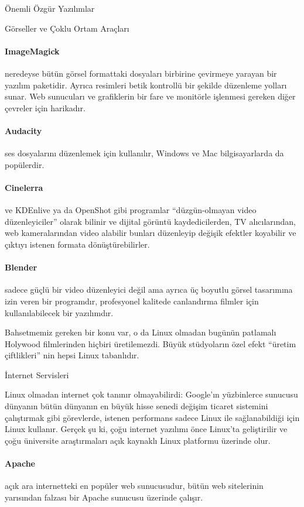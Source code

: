 \begin{section}{Önemli Özgür Yazılımlar}
\begin{subsection}{Görseller ve Çoklu Ortam Araçları}
\paragraph{ImageMagick}{neredeyse bütün görsel formattaki dosyaları birbirine çevirmeye yarayan bir yazılım paketidir. Ayrıca resimleri betik kontrollü bir şekilde düzenleme yolları sunar. Web sunucuları ve grafiklerin bir fare ve monitörle işlenmesi gereken diğer çevreler için harikadır.}
\paragraph{Audacity}{ses dosyalarını düzenlemek için kullanılır, Windows ve Mac bilgisayarlarda da popülerdir.}
\paragraph{Cinelerra}{ve KDEnlive ya da OpenShot gibi programlar “düzgün-olmayan video düzenleyiciler” olarak bilinir ve dijital görüntü kaydedicilerden, TV alıcılarından, web kameralarından video alabilir bunları düzenleyip değişik efektler koyabilir ve çıktıyı istenen formata dönüştürebilirler.}
\paragraph{Blender}{sadece güçlü bir video düzenleyici değil ama ayrıca üç boyutlu görsel tasarımına izin veren bir programdır, profesyonel kalitede canlandırma filmler için kullanılabilecek bir yazılımdır.}

Bahsetmemiz gereken bir konu var, o da Linux olmadan bugünün patlamalı Holywood filmlerinden hiçbiri üretilemezdi. Büyük stüdyoların özel efekt “üretim çiftlikleri” nin hepsi Linux tabanlıdır.
\end{subsection}
\begin{subsection}{İnternet Servisleri}

Linux olmadan internet çok tanınır olmayabilirdi: Google'ın yüzbinlerce sunucusu dünyanın bütün dünyanın en büyük hisse senedi değişim ticaret sistemini çalıştırmak gibi görevlerde, istenen performans sadece Linux ile sağlanabildiği için Linux kullanır. Gerçek şu ki, çoğu internet yazılımı önce Linux'ta geliştirilir ve çoğu üniversite araştırmaları açık kaynaklı Linux platformu üzerinde olur.

\paragraph{Apache}{açık ara internetteki en popüler web sunucusudur, bütün web sitelerinin yarısından falzası bir Apache sunucusu üzerinde çalışır.}

\end{subsection}
\end{section}
